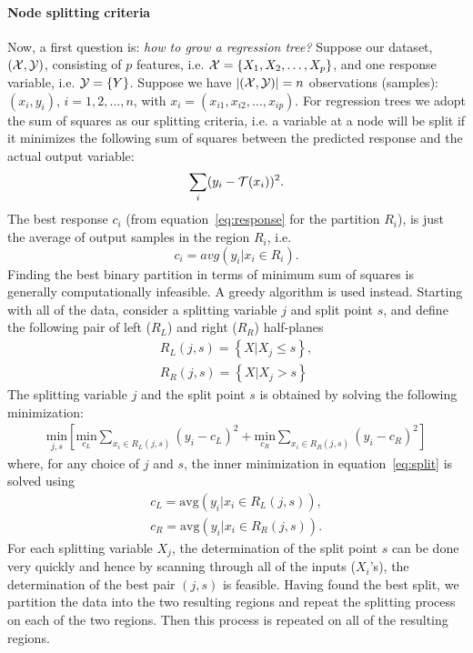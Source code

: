 \paragraph{Node splitting criteria}
Now, a first question is: \emph{how to grow a regression tree?}
Suppose our dataset, $(\mathcal{X},\mathcal{Y})$, consisting of $p$ features, i.e. $\mathcal{X} = \{X_1,X_2,\ldots,X_p\}$, and one response variable, i.e. $\mathcal{Y} = \{Y\}$. Suppose we have $|(\mathcal{X},\mathcal{Y})| = n$ observations (samples): $(x_i,y_i)$, $i=1,2,\ldots,n$, with $x_i=(x_{i1},x_{i2},\ldots,x_{ip})$.
For regression trees we adopt the sum of squares as our splitting criteria, i.e. a variable at a node will be split if it minimizes the following sum of squares between the predicted response and the actual output variable:
\begin{equation}
\sum_i (y_i - \mathcal{T}(x_i))^2.
\end{equation}
The best response $c_i$ (from equation~\ref{eq:response} for the partition $R_i$), is just the average of output samples in the region $R_i$, i.e.
\begin{equation}
c_i = avg(y_i|x_i \in R_i).
\label{eq:average}
\end{equation}
Finding the best binary partition in terms of minimum sum of squares is generally computationally infeasible. 
A greedy algorithm is used instead. Starting with all of the data, consider a splitting variable $j$ and split point $s$, and define the following pair of left ($R_L$) and right ($R_R$) half-planes
\begin{equation}
\begin{aligned}
R_L(j,s) = \left\lbrace X|X_j \leq s \right\rbrace ,\\
R_R(j,s) = \left\lbrace X|X_j > s \right\rbrace
\end{aligned}
\end{equation}
The splitting variable $j$ and the split point $s$ is obtained by solving the following minimization:
\begin{equation}
\begin{aligned}
\underset{j,s}{\text{min}}\left[\underset{c_L}{\text{min}} \sum_{x_i\in R_L(j,s)} (y_i - c_L)^2 + \underset{c_R}{\text{min}} \sum_{x_i\in R_R(j,s)} (y_i - c_R)^2 \right]  
\end{aligned}
\label{eq:split}
\end{equation}
where, for any choice of $j$ and $s$, the inner minimization in equation~\ref{eq:split} is solved using
\begin{equation}
\begin{aligned}
c_L = \text{avg}(y_i|x_i \in R_L(j,s)),\\
c_R = \text{avg}(y_i|x_i \in R_R(j,s)).
\end{aligned}
\end{equation}
For each splitting variable $X_j$, the determination of the split point $s$ can be done very quickly and hence by scanning through all of the inputs ($X_i$'s), the determination of the best pair $(j, s)$ is feasible.
Having found the best split, we partition the data into the two resulting regions and repeat the splitting process on each of the two regions. Then this process is repeated on all of the resulting regions.

